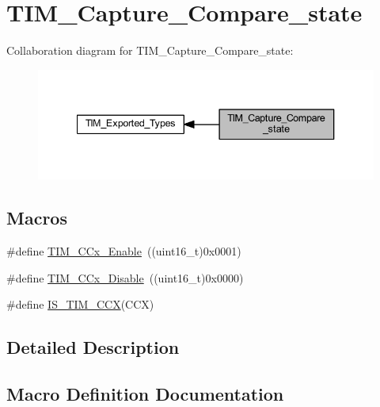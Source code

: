 \hypertarget{group___t_i_m___capture___compare__state}{}\section{T\+I\+M\+\_\+\+Capture\+\_\+\+Compare\+\_\+state}
\label{group___t_i_m___capture___compare__state}
Collaboration diagram for T\+I\+M\+\_\+\+Capture\+\_\+\+Compare\+\_\+state\+:
\nopagebreak
\begin{figure}[H]
\begin{center}
\leavevmode
\includegraphics[width=340pt]{group___t_i_m___capture___compare__state}
\end{center}
\end{figure}
\subsection*{Macros}
\begin{DoxyCompactItemize}
\item 
\#define \hyperlink{group___t_i_m___capture___compare__state_ga6acaeb60dad50ce9799ae9f62ed7719a}{T\+I\+M\+\_\+\+C\+Cx\+\_\+\+Enable}~((uint16\+\_\+t)0x0001)
\item 
\#define \hyperlink{group___t_i_m___capture___compare__state_gaa1441f66393b9daa9f97efb29b364cd3}{T\+I\+M\+\_\+\+C\+Cx\+\_\+\+Disable}~((uint16\+\_\+t)0x0000)
\item 
\#define \hyperlink{group___t_i_m___capture___compare__state_ga5b7461e8c9c25f6fa082118c95b02ba1}{I\+S\+\_\+\+T\+I\+M\+\_\+\+C\+CX}(C\+CX)
\end{DoxyCompactItemize}


\subsection{Detailed Description}


\subsection{Macro Definition Documentation}
\mbox{\label{group___t_i_m___capture___compare__state_ga5b7461e8c9c25f6fa082118c95b02ba1}} 
